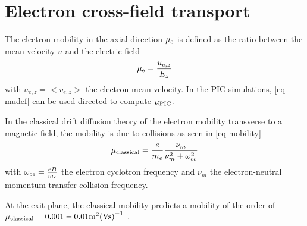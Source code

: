
\section{Electron cross-field transport}
  \label{sec-transport}
  
  
  The electron mobility in the axial direction $\mu_{\mathrm{e}}$ is defined as the ratio between the mean velocity $u$ and the electric field
  \begin{equation} \label{eq-mudef}
    \mu_{\mathrm{e}} = \frac{u_{e,z}}{E_z}
  \end{equation}
  with $u_{e,z}=<v_{e,z}>$ the electron mean velocity.
  In the \ac{PIC} simulations, \cref{eq-mudef} can be used directed to compute $\mu_{\mathrm{PIC}}$.
  
  In the classical drift diffusion theory of the electron mobility transverse to a magnetic field, the mobility is due to collisions as seen in \cref{eq-mobility} 
  \begin{equation} \label{eq-mobclas}
    \mu_{\mathrm{classical}} = \frac{e}{m_e} \frac{\nu_m}{\nu_m^2 + \omega_{ce}^2}
  \end{equation}
  with $\omega_{ce}=\frac{e B}{m_e}$ the electron cyclotron frequency and $\nu_m$ the electron-neutral momentum transfer collision frequency.
  
  At the exit plane, the classical mobility predicts a mobility of the order of $\mu_{\mathrm{classical}}=0.001-0.01 \text{m}^2\text{(Vs)}^{-1}$ \citep{adam2008a}.
  
